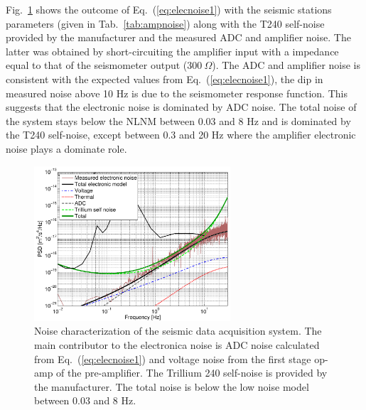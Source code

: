Fig.~\ref{Fig:Seis_noise} shows the outcome of Eq.~(\ref{eq:elecnoise1}) with the seismic stations parameters (given in Tab.~\ref{tab:ampnoise}) along with the T240 self-noise provided by the manufacturer and the measured ADC and amplifier noise. The latter was obtained by short-circuiting the amplifier input with a impedance equal to that of the seismometer output ($300~\Omega$). The ADC and amplifier noise is consistent with the expected values from Eq.~(\ref{eq:elecnoise1}), the dip in measured noise above 10 Hz is due to the seismometer response function. This suggests that the electronic noise is dominated by ADC noise. The total noise of the system stays below the NLNM between 0.03 and 8 Hz and is dominated by the T240 self-noise, except between 0.3 and 20 Hz where the amplifier electronic noise plays a dominate role.
\begin{figure}[h]
	\begin{center}
		\includegraphics[width=0.65\textwidth]{./Appendices/Figures/T240_noise_contributions.pdf}\hspace{1pc}%
		\caption{Noise characterization of the seismic data acquisition system. The main contributor to the electronica noise is ADC noise calculated from Eq.~(\ref{eq:elecnoise1}) and voltage noise from the first stage op-amp of the pre-amplifier. The Trillium 240 self-noise is provided by the manufacturer. The total noise is below the low noise model between 0.03 and 8 Hz.}
		\label{Fig:Seis_noise}
	\end{center}
\end{figure}

